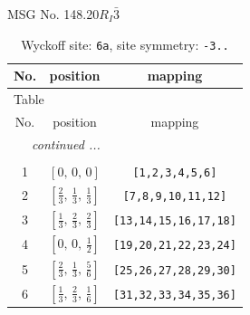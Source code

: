\documentclass[fleqn,8pt]{jsarticle}
\begin{document}
\setcounter{MaxMatrixCols}{32}

\renewcommand{\tablename}{Table~}
\renewcommand{\figurename}{Figure~}
\begin{center}
\LARGE
MSG No. 148.20\quad$R_{I}\bar{3}$
\end{center}
\renewcommand{\arraystretch}{1.2}
\begin{longtable}{ccc}
\caption{Wyckoff site: {\tt 6a}, site symmetry: {\tt -3..}}
 \\
 \hline \hline
No. & position & mapping \\ \hline \endfirsthead

\multicolumn{2}{l}{\tablename\ \thetable{}} \\
 \hline \hline
No. & position & mapping \\ \hline \endhead

 \hline \hline
\multicolumn{2}{r}{\footnotesize\it continued ...} \\ \endfoot

 \hline \hline
\multicolumn{2}{r}{} \\ \endlastfoot

1 & $\left[ 0,\, 0,\, 0 \right]$ & {\tt [1,2,3,4,5,6]} \\ \hline
2 & $\left[ \frac{2}{3},\, \frac{1}{3},\, \frac{1}{3} \right]$ & {\tt [7,8,9,10,11,12]} \\ \hline
3 & $\left[ \frac{1}{3},\, \frac{2}{3},\, \frac{2}{3} \right]$ & {\tt [13,14,15,16,17,18]} \\ \hline
4 & $\left[ 0,\, 0,\, \frac{1}{2} \right]$ & {\tt [19,20,21,22,23,24]} \\ \hline
5 & $\left[ \frac{2}{3},\, \frac{1}{3},\, \frac{5}{6} \right]$ & {\tt [25,26,27,28,29,30]} \\ \hline
6 & $\left[ \frac{1}{3},\, \frac{2}{3},\, \frac{1}{6} \right]$ & {\tt [31,32,33,34,35,36]} \\
\end{longtable}
\renewcommand{\arraystretch}{1.2}
\end{document}
